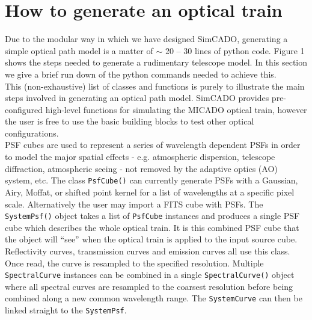 \documentclass[11pt,twoside]{article}
\begin{document}


\section{How to generate an optical train}
Due to the modular way in which we have designed SimCADO, generating a simple optical path model is a matter of $\sim$ 20 -- 30 lines of python code. Figure 1 shows the steps needed to generate a rudimentary telescope model. In this section we give a brief run down of the python commands needed to achieve this.\\

This (non-exhaustive) list of classes and functions is purely to illustrate the main steps involved in generating an optical path model. SimCADO provides pre-configured high-level functions for simulating the MICADO optical train, however the user is free to use the basic building blocks to test other optical configurations. \\

 PSF cubes are used to represent a series of wavelength dependent PSFs in order to model the major spatial effects - e.g. atmospheric dispersion, telescope diffraction, atmospheric seeing - not removed by the adaptive optics (AO) system, etc. The class \verb"PsfCube()" can currently generate PSFs with a Gaussian, Airy, Moffat, or shifted point kernel for a list of wavelengths at a specific pixel scale. Alternatively the user may import a FITS cube with PSFs. The \verb"SystemPsf()" object takes a list of \verb"PsfCube" instances and produces a single PSF cube which describes the whole optical train. It is this combined PSF cube that the object will ``see'' when the optical train is applied to the input source cube. \\

 Reflectivity curves, transmission curves and emission curves all use this class. Once read, the curve is resampled to the specified resolution. Multiple \verb"SpectralCurve" instances can be combined in a single \verb"SpectralCurve()" object where all spectral curves are resampled to the coarsest resolution before being combined along a new common wavelength range. The \verb"SystemCurve" can then be linked straight to the \verb"SystemPsf".\\
\end{document}
